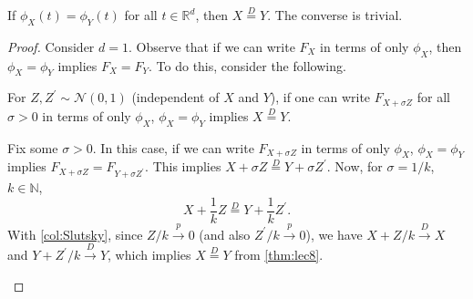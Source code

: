 \begin{theorem}[Uniqueness]\label{thm:characteristic-function-uniqueness}
	If \(\phi _X(t) = \phi _Y(t)\) for all \(t\in \mathbb{R} ^d\), then \(X\overset{D}{=} Y\). The converse is trivial.
\end{theorem}
\begin{proof}
	Consider \(d = 1\). Observe that if we can write \(F_X\) in terms of only \(\phi _X\), then \(\phi _X = \phi _Y\) implies \(F_X = F_Y\). To do this, consider the following.

	\begin{claim}
		For \(Z, Z^{\prime} \sim \mathcal{N} (0, 1)\) (independent of \(X\) and \(Y\)), if one can write \(F_{X + \sigma Z}\) for all \(\sigma > 0\) in terms of only \(\phi _X\), \(\phi _X = \phi _Y\) implies \(X \overset{D}{=} Y\).
	\end{claim}
	\begin{explanation}
		Fix some \(\sigma > 0\). In this case, if we can write \(F_{X + \sigma Z}\) in terms of only \(\phi _X\), \(\phi _X = \phi _Y\) implies \(F_{X + \sigma Z} = F_{Y + \sigma Z^{\prime} }\). This implies \(X + \sigma Z \overset{D}{=} Y + \sigma Z^{\prime} \). Now, for \(\sigma = 1 / k\), \(k \in \mathbb{N} \),
		\[
			X + \frac{1}{k} Z \overset{D}{=} Y + \frac{1}{k} Z^{\prime} .
		\]
		With \autoref{col:Slutsky}, since \(Z / k \overset{p}{\to } 0\) (and also \(Z^{\prime} / k \overset{p}{\to } 0\)), we have \(X + Z / k \overset{D}{\to } X\) and \(Y + Z^{\prime} / k \overset{D}{\to } Y\), which implies \(X \overset{D}{=} Y\) from \autoref{thm:lec8}.
	\end{explanation}


\end{proof}
